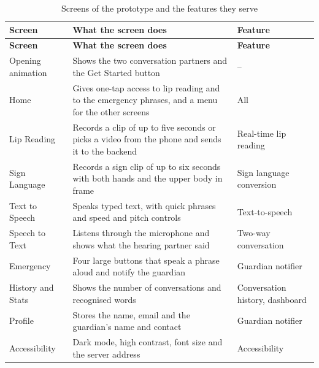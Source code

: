 \documentclass{FastFyp}
\begin{document}
\begingroup
\renewcommand{\arraystretch}{1.3}

\noindent
\begin{xltabular}{\linewidth}{|l|X|l|}
\caption{Screens of the prototype and the features they serve}\label{tab:screens} \\
\hline
\textbf{Screen} & \textbf{What the screen does} & \textbf{Feature} \\ \hline
\endfirsthead

\hline
\textbf{Screen} & \textbf{What the screen does} & \textbf{Feature} \\ \hline
\endhead

Opening animation & Shows the two conversation partners and the Get Started button & -- \\ \hline
Home & Gives one-tap access to lip reading and to the emergency phrases, and a menu for the other screens & All \\ \hline
Lip Reading & Records a clip of up to five seconds or picks a video from the phone and sends it to the backend & Real-time lip reading \\ \hline
Sign Language & Records a sign clip of up to six seconds with both hands and the upper body in frame & Sign language conversion \\ \hline
Text to Speech & Speaks typed text, with quick phrases and speed and pitch controls & Text-to-speech \\ \hline
Speech to Text & Listens through the microphone and shows what the hearing partner said & Two-way conversation \\ \hline
Emergency & Four large buttons that speak a phrase aloud and notify the guardian & Guardian notifier \\ \hline
History and Stats & Shows the number of conversations and recognised words & Conversation history, dashboard \\ \hline
Profile & Stores the name, email and the guardian's name and contact & Guardian notifier \\ \hline
Accessibility & Dark mode, high contrast, font size and the server address & Accessibility \\ \hline
\end{xltabular}
\endgroup
\end{document}

